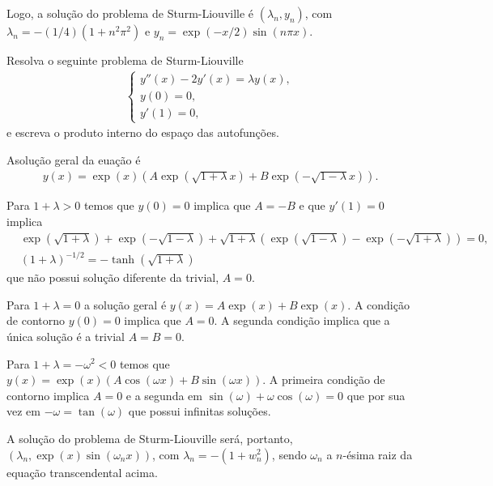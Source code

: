 \documentclass[a4paper,12pt, leqno, answers]{exam}
\begin{document}
\begin{questions}
\begin{solution}
        Logo, a solu\c{c}\~{a}o do problema de Sturm-Liouville \'{e} $(\lambda_n, y_n)$, com $\lambda_n = -(1/4) \left( 1 + n^2 \pi^2 \right)$ e $y_n = \exp(-x/2) \sin(n \pi x)$.
    \end{solution}

    \question[E de 2008] Resolva o seguinte problema de Sturm-Liouville
    \begin{align*}
        \begin{cases}
            y''(x) - 2 y'(x) = \lambda y(x), \\
            y(0) = 0, \\
            y'(1) = 0,
        \end{cases}
    \end{align*}
    e escreva o produto interno do espa\c{c}o das autofun\c{c}\~{o}es.
    \begin{solution}
        Asolu\c{c}\~{a}o geral da eua\c{c}\~{a}o \'{e}
        \begin{align*}
            y(x) = \exp(x) \left( A \exp(\sqrt{1 + \lambda} x) + B \exp(-\sqrt{1 - \lambda} x) \right).
        \end{align*}

        Para $1 + \lambda > 0$ temos que $y(0) = 0$ implica que $A = - B$ e que $y'(1) = 0$ implica
        \begin{align*}
            & \exp(\sqrt{1 + \lambda}) + \exp(-\sqrt{1 - \lambda}) + \sqrt{1 + \lambda} \left( \exp(\sqrt{1 - \lambda}) - \exp(-\sqrt{1 + \lambda}) \right) = 0, \\
            & (1 + \lambda)^{-1/2} = - \tanh(\sqrt{1 + \lambda})
        \end{align*}
        que n\~{a}o possui solu\c{c}\~{a}o diferente da trivial, $A = 0$.

        Para $1 + \lambda = 0$ a solu\c{c}\~{a}o geral \'{e} $y(x) = A \exp(x) + B \exp(x)$. A condi\c{c}\~{a}o de contorno $y(0) = 0$ implica que $A = 0$. A segunda condi\c{c}\~{a}o implica que a \'{u}nica solu\c{c}\~{a}o \'{e} a trivial $A = B = 0$.

        Para $1 + \lambda = - \omega^2 < 0$ temos que $y(x) = \exp(x) \left( A \cos(\omega x) + B \sin(\omega x) \right)$. A primeira condi\c{c}\~{a}o de contorno implica $A = 0$ e a segunda em $\sin(\omega) + \omega \cos(\omega) = 0$ que por sua vez em $- \omega = \tan(\omega)$ que possui infinitas solu\c{c}\~{o}es. 

        A solu\c{c}\~{a}o do problema de Sturm-Liouville ser\'{a}, portanto, $(\lambda_n, \exp(x) \sin(\omega_n x))$, com $\lambda_n = - (1 + w_n^2)$, sendo $\omega_n$ a $n$-\'{e}sima raiz da equa\c{c}\~{a}o transcendental acima.


\end{solution}
\end{questions}
\end{document}
